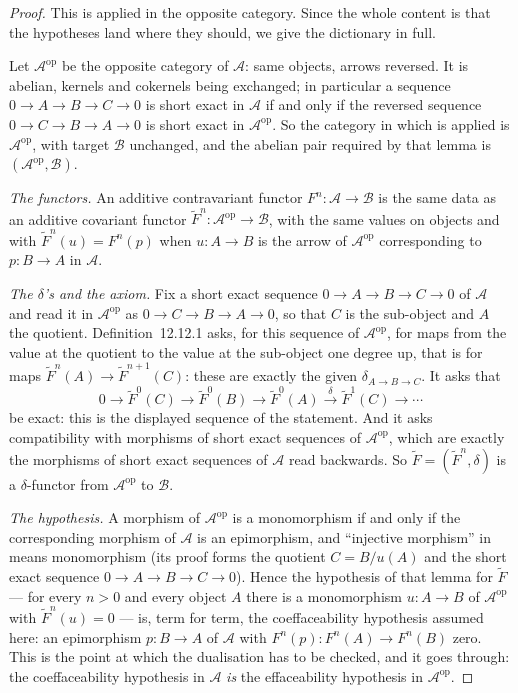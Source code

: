 \begin{proof}
This is  applied in the opposite
category.  Since the whole content is that the hypotheses land where
they should, we give the dictionary in full.

Let $\mathcal A^{\mathrm{op}}$ be the opposite category of
$\mathcal A$: same objects, arrows reversed.  It is abelian, kernels
and cokernels being exchanged; in particular a sequence
$0\to A\to B\to C\to0$ is short exact in $\mathcal A$ if and only if
the reversed sequence $0\to C\to B\to A\to0$ is short exact in
$\mathcal A^{\mathrm{op}}$.  So the category in which
 is applied is
$\mathcal A^{\mathrm{op}}$, with target $\mathcal B$ unchanged, and
the abelian pair required by that lemma is
$(\mathcal A^{\mathrm{op}},\mathcal B)$.

\emph{The functors.}  An additive contravariant functor
$F^n:\mathcal A\to\mathcal B$ is the same data as an additive
covariant functor
$\widetilde F^n:\mathcal A^{\mathrm{op}}\to\mathcal B$, with the same
values on objects and with $\widetilde F^n(u)=F^n(p)$ when
$u:A\to B$ is the arrow of $\mathcal A^{\mathrm{op}}$ corresponding
to $p:B\to A$ in $\mathcal A$.

\emph{The $\delta$'s and the axiom.}  Fix a short exact sequence
$0\to A\to B\to C\to0$ of $\mathcal A$ and read it in
$\mathcal A^{\mathrm{op}}$ as $0\to C\to B\to A\to0$, so that $C$ is
the sub-object and $A$ the quotient.  Definition~12.12.1 asks, for
this sequence of $\mathcal A^{\mathrm{op}}$, for maps from the value
at the quotient to the value at the sub-object one degree up, that
is for maps $\widetilde F^n(A)\to\widetilde F^{n+1}(C)$: these are
exactly the given $\delta_{A\to B\to C}$.  It asks that
\[
0\to\widetilde F^0(C)\to\widetilde F^0(B)\to\widetilde F^0(A)
\xrightarrow{\ \delta\ }\widetilde F^1(C)\to\cdots
\]
be exact: this is the displayed sequence of the statement.  And it
asks compatibility with morphisms of short exact sequences of
$\mathcal A^{\mathrm{op}}$, which are exactly the morphisms of short
exact sequences of $\mathcal A$ read backwards.  So
$\widetilde F=(\widetilde F^n,\delta)$ is a $\delta$-functor from
$\mathcal A^{\mathrm{op}}$ to $\mathcal B$.

\emph{The hypothesis.}  A morphism of $\mathcal A^{\mathrm{op}}$ is a
monomorphism if and only if the corresponding morphism of
$\mathcal A$ is an epimorphism, and ``injective morphism'' in
 means monomorphism (its proof
forms the quotient $C=B/u(A)$ and the short exact sequence
$0\to A\to B\to C\to0$).  Hence the hypothesis of that lemma for
$\widetilde F$ --- for every $n>0$ and every object $A$ there is a
monomorphism $u:A\to B$ of $\mathcal A^{\mathrm{op}}$ with
$\widetilde F^n(u)=0$ --- is, term for term, the coeffaceability
hypothesis assumed here: an epimorphism $p:B\to A$ of $\mathcal A$
with $F^n(p):F^n(A)\to F^n(B)$ zero.  This is the point at which the
dualisation has to be checked, and it goes through: the
coeffaceability hypothesis in $\mathcal A$ \emph{is} the
effaceability hypothesis in $\mathcal A^{\mathrm{op}}$.


\end{proof}
